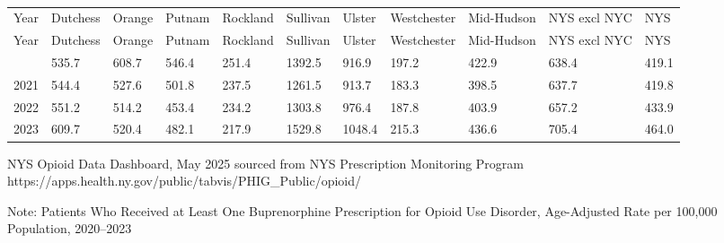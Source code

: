 \documentclass[
  english,
  letterpaper,
]{report}
\begin{document}
\begin{longtable}[]{@{}lllllllllll@{}}

\caption{\label{tbl-at-least-1-bup-aar}Patients Who Received at Least
One Buprenorphine Prescription for Opioid Use Disorder, Age-Adjusted
Rate per 100,000 Population, 2020--2023}

\tabularnewline

\caption{}\label{T_c9ded}\tabularnewline
\toprule\noalign{}
Year & Dutchess & Orange & Putnam & Rockland & Sullivan & Ulster &
Westchester & Mid-Hudson & NYS excl NYC & NYS \\
\midrule\noalign{}
\endfirsthead
\toprule\noalign{}
Year & Dutchess & Orange & Putnam & Rockland & Sullivan & Ulster &
Westchester & Mid-Hudson & NYS excl NYC & NYS \\
\midrule\noalign{}
\endhead
\bottomrule\noalign{}
\endlastfoot
2020 & 535.7 & 608.7 & 546.4 & 251.4 & 1392.5 & 916.9 & 197.2 & 422.9 &
638.4 & 419.1 \\
2021 & 544.4 & 527.6 & 501.8 & 237.5 & 1261.5 & 913.7 & 183.3 & 398.5 &
637.7 & 419.8 \\
2022 & 551.2 & 514.2 & 453.4 & 234.2 & 1303.8 & 976.4 & 187.8 & 403.9 &
657.2 & 433.9 \\
2023 & 609.7 & 520.4 & 482.1 & 217.9 & 1529.8 & 1048.4 & 215.3 & 436.6 &
705.4 & 464.0 \\

\end{longtable}

\begin{tcolorbox}[enhanced jigsaw, breakable, leftrule=.75mm, title=\textcolor{quarto-callout-note-color}{\faInfo}\hspace{0.5em}{Source}, bottomrule=.15mm, opacityback=0, left=2mm, colback=white, bottomtitle=1mm, coltitle=black, colbacktitle=quarto-callout-note-color!10!white, colframe=quarto-callout-note-color-frame, opacitybacktitle=0.6, toptitle=1mm, titlerule=0mm, arc=.35mm, rightrule=.15mm, toprule=.15mm]

NYS Opioid Data Dashboard, May 2025 sourced from NYS Prescription
Monitoring Program
https://apps.health.ny.gov/public/tabvis/PHIG\_Public/opioid/

\end{tcolorbox}

\begin{tcolorbox}[enhanced jigsaw, breakable, leftrule=.75mm, title=\textcolor{quarto-callout-note-color}{\faInfo}\hspace{0.5em}{Note}, bottomrule=.15mm, opacityback=0, left=2mm, colback=white, bottomtitle=1mm, coltitle=black, colbacktitle=quarto-callout-note-color!10!white, colframe=quarto-callout-note-color-frame, opacitybacktitle=0.6, toptitle=1mm, titlerule=0mm, arc=.35mm, rightrule=.15mm, toprule=.15mm]

Note: Patients Who Received at Least One Buprenorphine Prescription for
Opioid Use Disorder, Age-Adjusted Rate per 100,000 Population,
2020--2023

\end{tcolorbox}
\end{document}

